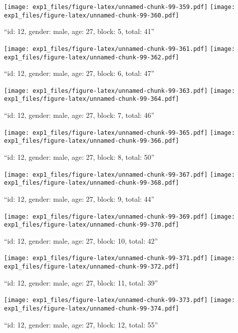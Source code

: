 \documentclass[,]{article}
\begin{document}
\texttt{[image: exp1\_files/figure-latex/unnamed-chunk-99-359.pdf]}
\texttt{[image: exp1\_files/figure-latex/unnamed-chunk-99-360.pdf]}

\newpage
[1] 

``id: 12, gender: male, age: 27, block: 5, total: 41''

\texttt{[image: exp1\_files/figure-latex/unnamed-chunk-99-361.pdf]}
\texttt{[image: exp1\_files/figure-latex/unnamed-chunk-99-362.pdf]}

\newpage
[1] 

``id: 12, gender: male, age: 27, block: 6, total: 47''

\texttt{[image: exp1\_files/figure-latex/unnamed-chunk-99-363.pdf]}
\texttt{[image: exp1\_files/figure-latex/unnamed-chunk-99-364.pdf]}

\newpage
[1] 

``id: 12, gender: male, age: 27, block: 7, total: 46''

\texttt{[image: exp1\_files/figure-latex/unnamed-chunk-99-365.pdf]}
\texttt{[image: exp1\_files/figure-latex/unnamed-chunk-99-366.pdf]}

\newpage
[1] 

``id: 12, gender: male, age: 27, block: 8, total: 50''

\texttt{[image: exp1\_files/figure-latex/unnamed-chunk-99-367.pdf]}
\texttt{[image: exp1\_files/figure-latex/unnamed-chunk-99-368.pdf]}

\newpage
[1] 

``id: 12, gender: male, age: 27, block: 9, total: 44''

\texttt{[image: exp1\_files/figure-latex/unnamed-chunk-99-369.pdf]}
\texttt{[image: exp1\_files/figure-latex/unnamed-chunk-99-370.pdf]}

\newpage
[1] 

``id: 12, gender: male, age: 27, block: 10, total: 42''

\texttt{[image: exp1\_files/figure-latex/unnamed-chunk-99-371.pdf]}
\texttt{[image: exp1\_files/figure-latex/unnamed-chunk-99-372.pdf]}

\newpage
[1] 

``id: 12, gender: male, age: 27, block: 11, total: 39''

\texttt{[image: exp1\_files/figure-latex/unnamed-chunk-99-373.pdf]}
\texttt{[image: exp1\_files/figure-latex/unnamed-chunk-99-374.pdf]}

\newpage
[1] 

``id: 12, gender: male, age: 27, block: 12, total: 55''
\end{document}
